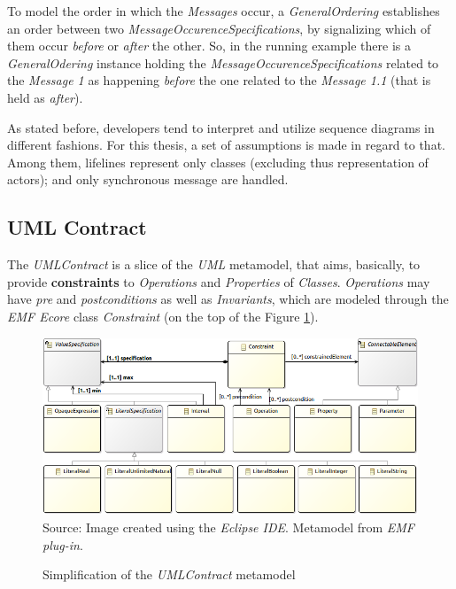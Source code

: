 \documentclass[tuberlin,cic,tc,english,noabntcite,oneside]{iiufrgs}
\begin{document}
To model the order in which the \emph{Messages} occur, a \emph{GeneralOrdering} establishes an order between two \emph{MessageOccurenceSpecifications}, by signalizing which of them occur \emph{before} or \emph{after} the other. So, in the running example there is a \emph{GeneralOdering} instance holding the \emph{MessageOccurenceSpecifications} related to the \emph{Message 1} as happening \emph{before} the one related to the \emph{Message 1.1} (that is held as \emph{after}).

As stated before, developers tend to interpret and utilize sequence diagrams in different fashions. For this thesis, a set of assumptions is made in regard to that. Among them, lifelines represent only classes (excluding thus representation of actors); and only synchronous message are handled.

\subsection{UML Contract}
The \emph{UMLContract} is a slice of the \emph{UML} metamodel, that aims, basically, to provide \textbf{constraints} to \emph{Operations} and \emph{Properties} of \emph{Classes}. \emph{Operations} may have \emph{pre} and \emph{postconditions} as well as \emph{Invariants}, which are modeled through the \emph{EMF Ecore} class \emph{Constraint} (on the top of the Figure \ref{fig:uml_metamodel_contracts}).

\begin{figure}[H]
	\centering
    \caption{Simplification of the \emph{UMLContract} metamodel}
    \includegraphics[width=\textwidth]{umlContractSimple01} \\
    Source: Image created using the \emph{Eclipse IDE}. Metamodel from \emph{EMF plug-in}.
    \label{fig:uml_metamodel_contracts}
\end{figure}
\end{document}

